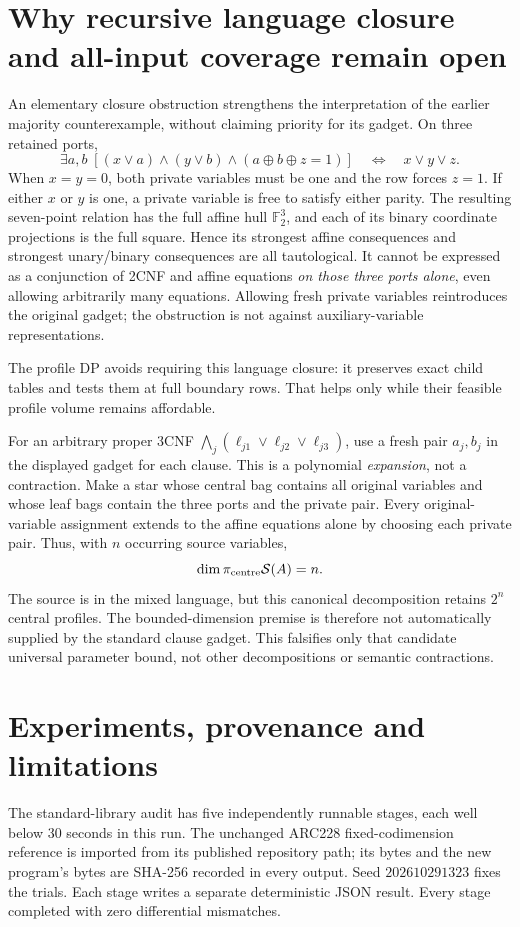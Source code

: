 \documentclass[11pt]{article}
\newcommand{\F}{\mathbb F_2}
\begin{document}
\section{Why recursive language closure and all-input coverage remain open}
An elementary closure obstruction strengthens the interpretation of the earlier majority counterexample, without claiming priority for its gadget. On three retained ports,
\[
 \exists a,b\;[(x\vee a)\wedge(y\vee b)\wedge(a\oplus b\oplus z=1)]
 \quad\Longleftrightarrow\quad x\vee y\vee z.
\]
When $x=y=0$, both private variables must be one and the row forces $z=1$. If either $x$ or $y$ is one, a private variable is free to satisfy either parity. The resulting seven-point relation has the full affine hull $\F^3$, and each of its binary coordinate projections is the full square. Hence its strongest affine consequences and strongest unary/binary consequences are all tautological. It cannot be expressed as a conjunction of 2CNF and affine equations \emph{on those three ports alone}, even allowing arbitrarily many equations. Allowing fresh private variables reintroduces the original gadget; the obstruction is not against auxiliary-variable representations.

The profile DP avoids requiring this language closure: it preserves exact child tables and tests them at full boundary rows. That helps only while their feasible profile volume remains affordable.

For an arbitrary proper 3CNF $\bigwedge_j(\ell_{j1}\vee\ell_{j2}\vee\ell_{j3})$, use a fresh pair $a_j,b_j$ in the displayed gadget for each clause. This is a polynomial \emph{expansion}, not a contraction. Make a star whose central bag contains all original variables and whose leaf bags contain the three ports and the private pair. Every original-variable assignment extends to the affine equations alone by choosing each private pair. Thus, with $n$ occurring source variables,
\[
 \dim\pi_{\rm centre}\mathcal S(A)=n.
\]
The source is in the mixed language, but this canonical decomposition retains $2^n$ central profiles. The bounded-dimension premise is therefore not automatically supplied by the standard clause gadget. This falsifies only that candidate universal parameter bound, not other decompositions or semantic contractions.

\section{Experiments, provenance and limitations}
The standard-library audit has five independently runnable stages, each well below 30 seconds in this run. The unchanged ARC228 fixed-codimension reference is imported from its published repository path; its bytes and the new program's bytes are SHA-256 recorded in every output. Seed $202610291323$ fixes the trials. Each stage writes a separate deterministic JSON result. Every stage completed with zero differential mismatches.
\end{document}
